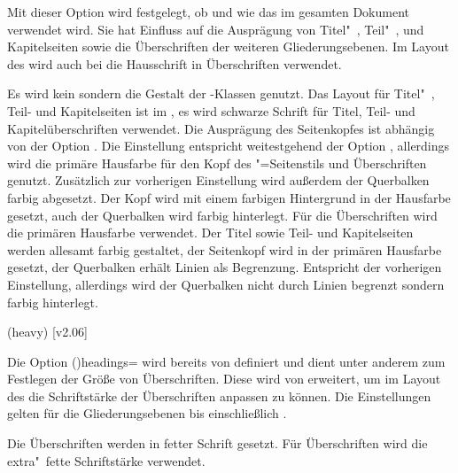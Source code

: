 \begin{DeclareEntity*}{}
\begin{DeclareEntity*}{}
\begin{DeclareEntity*}{}
\begin{Declaration}
Mit dieser Option wird festgelegt, ob und wie das \TUDCD im gesamten Dokument 
verwendet wird. Sie hat Einfluss auf die Ausprägung von Titel"~, Teil"~, und 
Kapitelseiten sowie die Überschriften der weiteren Gliederungsebenen. 
Im Layout des \CDs wird auch bei  die Hausschrift in 
Überschriften verwendet.
%
\begin{DeclareValues}{}
  Es wird kein \CD sondern die Gestalt der \KOMAScript-Klassen genutzt.
  Das Layout für Titel"~, Teil- und Kapitelseiten ist im \CD, es wird 
  schwarze Schrift für Titel, Teil- und Kapitelüberschriften verwendet.
  Die Ausprägung des Seitenkopfes ist abhängig von der Option .
  Die Einstellung entspricht weitestgehend der Option , 
  allerdings wird die primäre Hausfarbe  für den Kopf des 
  "=Seitenstils und Überschriften genutzt.
  Zusätzlich zur vorherigen Einstellung wird außerdem der Querbalken farbig 
  abgesetzt.
  Der Kopf wird mit einem farbigen Hintergrund in der Hausfarbe gesetzt, auch 
  der Querbalken wird farbig hinterlegt. Für die Überschriften wird die 
  primären Hausfarbe verwendet.
  Der Titel sowie Teil- und Kapitelseiten werden allesamt farbig gestaltet, 
  der Seitenkopf wird in der primären Hausfarbe  gesetzt, der 
  Querbalken erhält Linien als Begrenzung.
  Entspricht der vorherigen Einstellung, allerdings wird der Querbalken nicht 
  durch Linien begrenzt sondern farbig hinterlegt.
\end{DeclareValues}
\end{Declaration}
%

\begin{Declaration}
  {}
  (heavy)
  [v2.06]
\printdeclarationlist[Schriftstärke]

Die Option \Option(){headings=\PMisc} 
wird bereits von \KOMAScript definiert und dient unter anderem zum Festlegen der
Größe von Überschriften. Diese wird von \TUDScript erweitert, um im Layout des 
\CDs die Schriftstärke der Überschriften anpassen zu können. Die Einstellungen 
gelten für die Gliederungsebenen bis einschließlich .
%
\begin{DeclareValues}{}
  Die Überschriften werden in fetter Schrift gesetzt.
  Für Überschriften wird die extra"~fette Schriftstärke verwendet.
\end{DeclareValues}
\end{Declaration}




\end{DeclareEntity*}
\end{DeclareEntity*}
\end{DeclareEntity*}
